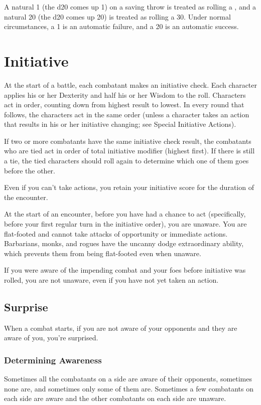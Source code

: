  A natural 1 (the d20 comes up 1) on a saving throw is treated as rolling a , and a natural 20 (the d20 comes up 20) is treated as rolling a 30. Under normal circumstances, a 1 is an automatic failure, and a 20 is an automatic success.

\section{Initiative}
 At the start of a battle, each combatant makes an initiative check. Each character applies his or her Dexterity and half his or her Wisdom to the roll. Characters act in order, counting down from highest result to lowest. In every round that follows, the characters act in the same order (unless a character takes an action that results in his or her initiative changing; see Special Initiative Actions).

If two or more combatants have the same initiative check result, the combatants who are tied act in order of total initiative modifier (highest first). If there is still a tie, the tied characters should roll again to determine which one of them goes before the other.

 Even if you can't take actions, you retain your initiative score for the duration of the encounter.

 At the start of an encounter, before you have had a chance to act (specifically, before your first regular turn in the initiative order), you are unaware. You are flat-footed and cannot take attacks of opportunity or immediate actions. Barbarians, monks, and rogues have the uncanny dodge extraordinary ability, which prevents them from being flat-footed even when unaware.

If you were aware of the impending combat and your foes before initiative was rolled, you are not unaware, even if you have not yet taken an action.

\subsection{Surprise}
When a combat starts, if you are not aware of your opponents and they are aware of you, you're surprised.

\subsubsection{Determining Awareness}
Sometimes all the combatants on a side are aware of their opponents, sometimes none are, and sometimes only some of them are. Sometimes a few combatants on each side are aware and the other combatants on each side are unaware.

